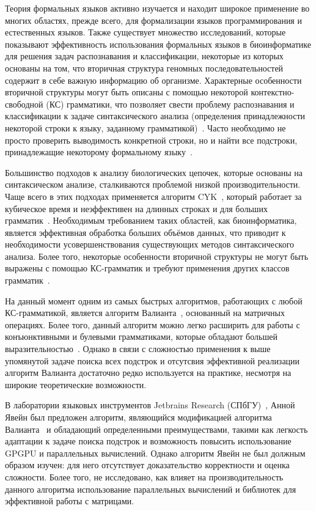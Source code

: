 \documentclass[14pt]{matmex-diploma-custom}
\begin{document}
Теория формальных языков активно изучается и находит широкое применение во многих областях, прежде всего, для формализации языков программирования и естественных языков. 
Также существует множество исследований, которые показывают эффективность использования формальных языков в биоинформатике  для решения задач распознавания и классификации, некоторые из которых основаны на том, что вторичная структура геномных последовательностей содержит в себе важную информацию об организме. 
Характерные особенности вторичной структуры могут быть описаны с помощью некоторой контекстно-свободной (КС) грамматики, что позволяет свести проблему распознавания и классификации к задаче синтаксического анализа (определения принадлежности некоторой строки к языку, заданному грамматикой)~\cite{dowell2004evaluation, knudsen1999rna, rivas2000language}. 
Часто необходимо не просто проверить выводимость конкретной строки, но и найти все подстроки, принадлежащие некоторому формальному языку~\cite{durbin1996biological}.

Большинство подходов к анализу биологических цепочек, которые основаны на синтаксическом анализе, сталкиваются проблемой низкой производительности. 
Чаще всего в этих подходах применяется алгоритм CYK~\cite{kasami1966efficient, Younger:1966:CLP:1441427.1442019}, который работает за кубическое время и неэффективен на длинных строках и для больших грамматик~\cite{liu2005parallel}. 
Необходимым требованием таких областей, как биоинформатика, является эффективная обработка больших объёмов данных, что приводит к необходимости усовершенствования существующих методов синтаксического анализа.
Более того, некоторые особенности вторичной структуры не могут быть выражены с помощью КС-грамматик и требуют применения других классов грамматик~\cite{zier2013rna}.

На данный момент одним из самых быстрых алгоритмов, работающих с любой КС-грамматикой, является алгоритм Валианта~\cite{Valiant:1975:GCR:1739932.1740048}, основанный на матричных операциях.
Более того, данный алгоритм можно легко расширить для работы с конъюнктивными и булевыми грамматиками, которые обладают большей выразительностью~\cite{Okhotin:2014:PMM:2565359.2565379}. 
Однако в связи с сложностью  применения к выше упомянутой задаче поиска всех подстрок и отсутсвия эффективной реализации алгоритм Валианта достаточно редко используется на практике, несмотря на широкие теоретические возможности.

В лаборатории языковых инструментов Jetbrains Research (СПбГУ)~\cite{jetbrains}, Анной Явейн был предложен алгоритм, являющийся модификацией алгоритма Валианта~\cite{alg} и обладающий определенными преимуществами, такими как легкость адаптации к задаче поиска подстрок и возможность повысить использование GPGPU и параллельных вычислений. 
Однако алгоритм Явейн не был должным образом изучен: для него отсутствует доказательство корректности и оценка сложности. 
Более того, не исследовано, как влияет на производительность данного алгоритма использование параллельных вычислений и библиотек для эффективной работы с матрицами.
\end{document}
